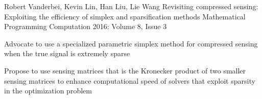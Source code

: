 \begin{cventries}
  \cventry
    {Robert Vanderbei, Kevin Lin, Han Liu, Lie Wang} %
    {Revisiting compressed sensing: Exploiting the efficiency of simplex and sparsification methods}
    {Mathematical Programming Computation} %
    {2016: Volume 8, Issue 3} %
    {
      \begin{cvitems} %
        \item {Advocate to use a specialized parametric simplex method for compressed sensing
        when the true signal is extremely sparse}
        \item {Propose to use sensing matrices that is the Kronecker product of two smaller sensing
        matrices to enhance computational speed of solvers that exploit sparsity in the optimization
        problem}
      \end{cvitems}
    }

\end{cventries}
